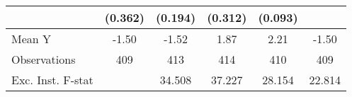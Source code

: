 {\begin{tabular}{l*{5}{c}}
            &     (0.362)         &     (0.194)         &     (0.312)         &     (0.093)         &                     \\
\midrule
Mean Y      &       -1.50         &       -1.52         &        1.87         &        2.21         &       -1.50         \\
Observations&         409         &         413         &         414         &         410         &         409         \\
Exc. Inst. F-stat&                     &      34.508         &      37.227         &      28.154         &      22.814         \\
\bottomrule
\end{tabular}
}
